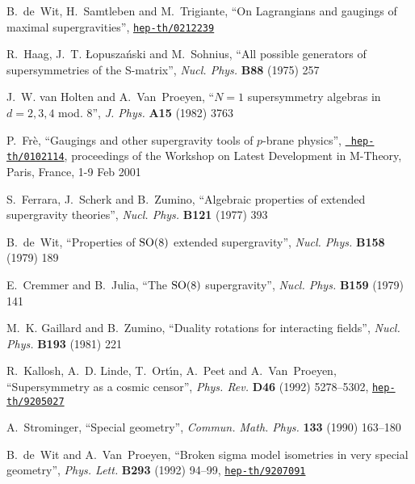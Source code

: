 \documentclass[a4paper,11pt,twoside]{article}
\newcommand{\SO}{\mathop{\rm SO}}
\begin{document}
\begin{thebibliography}{10}
{\sc B.~de~Wit, H.~Samtleben  and M.~Trigiante}, ``On Lagrangians and
gaugings
  of maximal supergravities'',
\href{http://www.arXiv.org/abs/hep-th/0212239}{{\tt hep-th/0212239}}

{\sc R.~Haag, J.~T. {\L}opusza\'nski  and M.~Sohnius}, ``All possible
  generators of supersymmetries of the S-matrix'',  {\sl Nucl. Phys.} {\bf B88}
  (1975)
257

{\sc J.~W. van Holten and A.~Van~Proeyen}, ``$N = 1$ supersymmetry
algebras in
  $d = 2,3,4$ mod. 8'',  {\sl J. Phys.} {\bf A15} (1982)
3763

{\sc P.~Fr{\`e}}, ``Gaugings and other supergravity tools of $p$-brane
  physics'',  \href{http://www.arXiv.org/abs/hep-th/0102114}{{\tt
  hep-th/0102114}},
proceedings of the Workshop on Latest Development in M-Theory, Paris,
France,
  1-9 Feb 2001

{\sc S.~Ferrara, J.~Scherk  and B.~Zumino}, ``Algebraic properties of
extended
  supergravity theories'',  {\sl Nucl. Phys.} {\bf B121} (1977)
393

{\sc B.~de~Wit}, ``Properties of $\SO(8)$ extended supergravity'',  {\sl
Nucl.
  Phys.} {\bf B158} (1979)
189

{\sc E.~Cremmer and B.~Julia}, ``The $\SO(8)$ supergravity'',  {\sl Nucl.
  Phys.} {\bf B159} (1979)
141

{\sc M.~K. Gaillard and B.~Zumino}, ``Duality rotations for interacting
  fields'',  {\sl Nucl. Phys.} {\bf B193} (1981)
221

{\sc R.~Kallosh, A.~D. Linde, T.~Ort{\'\i}n, A.~Peet  and A.~Van~Proeyen},
  ``Supersymmetry as a cosmic censor'',  {\sl Phys. Rev.} {\bf D46} (1992)
  5278--5302,
\href{http://arXiv.org/abs/hep-th/9205027}{{\tt hep-th/9205027}}

{\sc A.~Strominger}, ``Special geometry'',  {\sl Commun. Math. Phys.}
{\bf 133}
  (1990)
163--180

{\sc B.~de~Wit and A.~Van~Proeyen}, ``Broken sigma model isometries in
very
  special geometry'',  {\sl Phys. Lett.} {\bf B293} (1992) 94--99,
\href{http://arXiv.org/abs/hep-th/9207091}{{\tt hep-th/9207091}}


\end{thebibliography}
\end{document}
